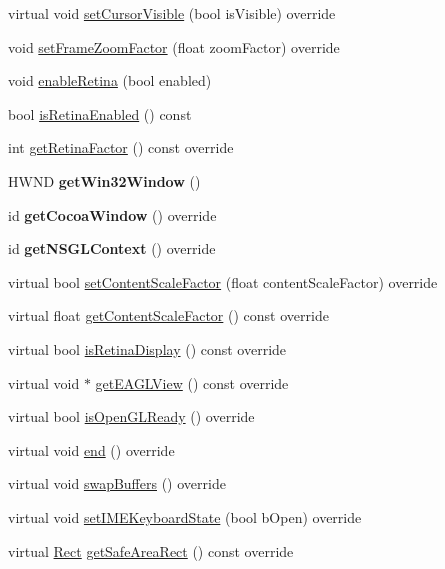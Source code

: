 \begin{DoxyCompactItemize}
\item 
virtual void \hyperlink{classGLViewImpl_a7e609efc4d34d98544b42e5f18ff29b8}{set\+Cursor\+Visible} (bool is\+Visible) override
\item 
void \hyperlink{classGLViewImpl_aa8868ddca63e739ecfc2beeeaa61c1dd}{set\+Frame\+Zoom\+Factor} (float zoom\+Factor) override
\item 
void \hyperlink{classGLViewImpl_acbad07a997193bc23d8bec639f333040}{enable\+Retina} (bool enabled)
\item 
bool \hyperlink{classGLViewImpl_ab05ff2acc127d3eaeacefd9a5b116550}{is\+Retina\+Enabled} () const
\item 
int \hyperlink{classGLViewImpl_a0844b876076edafc4f6e47e3fafb16da}{get\+Retina\+Factor} () const override
\item 
\mbox{\label{classGLViewImpl_a0e04667b5e20aa6e96627418ee4110bd}} 
H\+W\+ND {\bfseries get\+Win32\+Window} ()
\item 
\mbox{\label{classGLViewImpl_a25fd0aa14c1928428f28dcf6831e850a}} 
id {\bfseries get\+Cocoa\+Window} () override
\item 
\mbox{\label{classGLViewImpl_ae3d770f66f854a612e6f5f5451e8e59f}} 
id {\bfseries get\+N\+S\+G\+L\+Context} () override
\item 
virtual bool \hyperlink{classGLViewImpl_ae5fc53c9751b15efc4a6a1bc12db262c}{set\+Content\+Scale\+Factor} (float content\+Scale\+Factor) override
\item 
virtual float \hyperlink{classGLViewImpl_a475f5c382360141199bf110655941a22}{get\+Content\+Scale\+Factor} () const override
\item 
virtual bool \hyperlink{classGLViewImpl_a3c02a8e95e8f2ee4821935f78be3f6b0}{is\+Retina\+Display} () const override
\item 
virtual void $\ast$ \hyperlink{classGLViewImpl_aaddd8dc59db9a517edb63238f79e1c55}{get\+E\+A\+G\+L\+View} () const override
\item 
virtual bool \hyperlink{classGLViewImpl_af539e58d1d28db65ba47f107c9c801d7}{is\+Open\+G\+L\+Ready} () override
\item 
virtual void \hyperlink{classGLViewImpl_ab5a08a3ea92598cdabbed94686eed58a}{end} () override
\item 
virtual void \hyperlink{classGLViewImpl_ab434675d26eb367ae74f9533c34d2ca7}{swap\+Buffers} () override
\item 
virtual void \hyperlink{classGLViewImpl_a37e04acaf52f6258ebe98d6b36c3b6c3}{set\+I\+M\+E\+Keyboard\+State} (bool b\+Open) override
\item 
virtual \hyperlink{classRect}{Rect} \hyperlink{classGLViewImpl_aeae826111cb62438b2038d311b95049b}{get\+Safe\+Area\+Rect} () const override
\end{DoxyCompactItemize}
